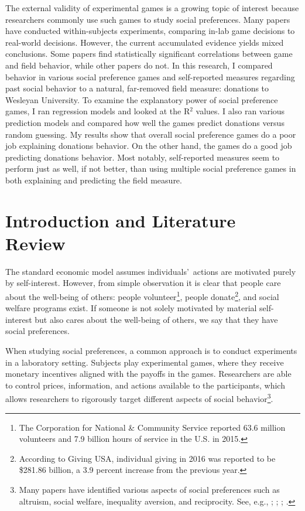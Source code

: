 \documentclass[12pt]{article}
\begin{document}
The external validity of experimental games is a growing topic of interest because researchers commonly use such games to study social preferences. Many papers have conducted within-subjects experiments, comparing in-lab game decisions to real-world decisions. However, the current accumulated evidence yields mixed conclusions. Some papers find statistically significant correlations between game and field behavior, while other papers do not. In this research, I compared behavior in various social preference games and self-reported measures regarding past social behavior to a natural, far-removed field measure: donations to Wesleyan University. To examine the explanatory power of social preference games, I ran regression models and looked at the R$^{2}$ values. I also ran various prediction models and compared how well the games predict donations versus random guessing. My results show that overall social preference games do a poor job explaining donations behavior. On the other hand, the games do a good job predicting donations behavior. Most notably, self-reported measures seem to perform just as well, if not better, than using multiple social preference games in both explaining and predicting the field measure.



\newpage


\doublespacing
\section{Introduction and Literature Review}

The standard economic model assumes individuals\rq \ actions are motivated purely by self-interest. However, from simple observation it is clear that people care about the well-being of others: people volunteer\footnote{The Corporation for National \& Community Service reported 63.6 million volunteers and 7.9 billion hours of service in the U.S. in 2015.}, people donate\footnote{According to Giving USA, individual giving in 2016 was reported to be \$281.86 billion, a 3.9 percent increase from the previous year.}, and social welfare programs exist. If someone is not solely motivated by material self-interest but also cares about the well-being of others, we say that they have social preferences. 

When studying social preferences, a common approach is to conduct experiments in a laboratory setting. Subjects play experimental games, where they receive monetary incentives aligned with the payoffs in the games. Researchers are able to control prices, information, and actions available to the participants, which allows researchers to rigorously target different aspects of social behavior\footnote{Many papers have identified various aspects of social preferences such as altruism, social welfare, inequality aversion, and reciprocity. See, e.g., \cite{charness_rabin_2002}; \cite{fehr_schmidt_1999}; \cite{rabin_1993}; \cite{fisman_jakiela_kariv_2014}.}.
\end{document}
